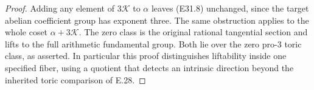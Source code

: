 \begin{proof}
Adding any element of $3\mathcal K$ to $\alpha$ leaves
(E31.8) unchanged, since the target abelian coefficient group
has exponent three. The same obstruction applies to the
whole coset $\alpha+3\mathcal K$. The zero class is the original
rational tangential section and lifts to the full arithmetic
fundamental group. Both lie over the zero pro-$3$ toric class,
as asserted. In particular this proof distinguishes
liftability inside one specified fiber, using a quotient that
detects an intrinsic direction beyond the inherited toric
comparison of E.28.
\end{proof}
